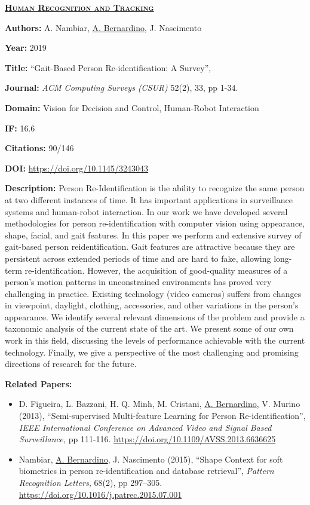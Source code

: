 \clearpage

\textbf{\textsc{\ul{Human Recognition and Tracking}}}

\textbf{Authors:} A. Nambiar, \ul{A. Bernardino}, J. Nascimento

\textbf{Year:} 2019

\textbf{Title:} ``Gait-Based Person Re-identification: A Survey'',

\textbf{Journal:} \emph{ACM Computing Surveys (CSUR)} 52(2), 33, pp
1-34.

\textbf{Domain:} Vision for Decision and Control, Human-Robot
Interaction

\textbf{IF:} 16.6

\textbf{Citations:} 90/146

\textbf{DOI:} \url{https://doi.org/10.1145/3243043}~

\textbf{Description:} Person Re-Identification is the ability to
recognize the same person at two different instances of time. It has
important applications in surveillance systems and human-robot
interaction. In our work we have developed several methodologies for
person re-identification with computer vision using appearance, shape,
facial, and gait features. In this paper we perform and extensive survey
of gait-based person reidentification. Gait features are attractive
because they are persistent across extended periods of time and are hard
to fake, allowing long-term re-identification. However, the acquisition
of good-quality measures of a person's motion patterns in unconstrained
environments has proved very challenging in practice. Existing
technology (video cameras) suffers from changes in viewpoint, daylight,
clothing, accessories, and other variations in the person's appearance.
We identify several relevant dimensions of the problem and provide a
taxonomic analysis of the current state of the art. We present some of
our own work in this field, discussing the levels of performance
achievable with the current technology. Finally, we give a perspective
of the most challenging and promising directions of research for the
future.

\textbf{Related Papers:}

\begin{itemize}
\item
  D. Figueira, L. Bazzani, H. Q. Minh, M. Cristani, \ul{A. Bernardino},
  V. Murino (2013), ``Semi-supervised Multi-feature Learning for Person
  Re-identification'', \emph{IEEE International Conference on Advanced
  Video and Signal Based Surveillance,} pp 111-116.
  \url{https://doi.org/10.1109/AVSS.2013.6636625}
\item
  Nambiar, \ul{A. Bernardino}, J. Nascimento (2015), ``Shape Context for
  soft biometrics in person re-identification and database retrieval'',
  \emph{Pattern Recognition Letters,} 68(2), pp 297--305.
  \url{https://doi.org/10.1016/j.patrec.2015.07.001}
\end{itemize}

